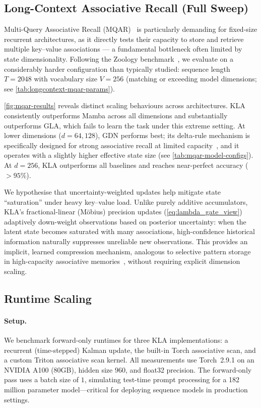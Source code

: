 \documentclass{article}
\begin{document}
\subsection{Long-Context Associative Recall (Full Sweep)}
\label{sec:longcontext-mqar-results}
Multi-Query Associative Recall (MQAR)~\citep{arora2023zoology} is particularly demanding for fixed-size recurrent architectures, as it directly tests their capacity to store and retrieve multiple key--value associations --- a fundamental bottleneck often limited by state dimensionality. Following the Zoology benchmark~\citep{arora2023zoology}, we evaluate on a considerably harder configuration than typically studied: sequence length $T=2048$ with vocabulary size $V=256$ (matching or exceeding model dimensions; see \cref{tab:longcontext-mqar-params}).

\cref{fig:mqar-results} reveals distinct scaling behaviours across architectures. \textsc{KLA} consistently outperforms Mamba across all dimensions and substantially outperforms GLA, which fails to learn the task under this extreme setting. At lower dimensions ($d=64,128$), GDN performs best; its delta-rule mechanism is specifically designed for strong associative recall at limited capacity~\citep{yang2024gated}, and it operates with a slightly higher effective state size (see \cref{tab:mqar-model-configs}). At $d=256$, \textsc{KLA} outperforms all baselines and reaches near-perfect accuracy ($>95\%$).

We hypothesise that uncertainty-weighted updates help mitigate state ``saturation'' under heavy key--value load. Unlike purely additive accumulators, \textsc{KLA}'s fractional-linear (M\"{o}bius) precision updates (\cref{eq:lambda_gate_view}) adaptively down-weight observations based on posterior uncertainty: when the latent state becomes saturated with many associations, high-confidence historical information naturally suppresses unreliable new observations. This provides an implicit, learned compression mechanism, analogous to selective pattern storage in high-capacity associative memories~\citep{storkey1997hopfield}, without requiring explicit dimension scaling.



\subsection{Runtime Scaling}
\label{sec:fwd-scaling}

\paragraph{Setup.}
We benchmark forward-only runtimes for three \textsc{KLA} implementations:
a recurrent (time-stepped) Kalman update, the built-in Torch associative scan, and a custom Triton associative scan kernel.
All measurements use Torch~2.9.1 on an NVIDIA A100 (80GB), hidden size $960$, and float32 precision.
The forward-only pass uses a batch size of $1$, simulating test-time prompt processing for a 182 million parameter model---critical for deploying sequence models in production settings.
\end{document}
